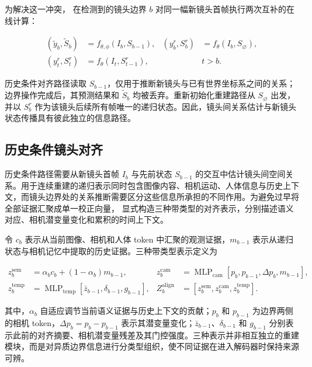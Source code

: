 为解决这一冲突，\method{} 在检测到的镜头边界 $b$ 对同一幅新镜头首帧执行两次互补的在线计算：

\begin{equation}
\begin{aligned}
 (\widetilde y_b,\widetilde S_b)&=f_{\theta,\phi}(I_b,S_{b-1}), &
 (y_b^r,S_b^r)&=f_\theta(I_b,S_{\varnothing}),\\
 (y_t^r,S_t^r)&=f_\theta(I_t,S_{t-1}^r), && t>b.
\end{aligned}
\label{eq:boundary-paths-zh}
\end{equation}

历史条件对齐路径读取 $S_{b-1}$，仅用于推断新镜头与已有世界坐标系之间的关系；边界操作完成后，其预测结果和 $\widetilde S_b$ 均被丢弃。重新初始化重建路径从 $S_{\varnothing}$ 出发，并以 $S_b^r$ 作为该镜头后续所有帧唯一的递归状态。因此，镜头间关系估计与新镜头状态传播具有彼此独立的信息路径。

\subsection{历史条件镜头对齐}

历史条件路径需要从新镜头首帧 $I_b$ 与先前状态 $S_{b-1}$ 的交互中估计镜头间空间关系。用于连续重建的递归表示同时包含图像内容、相机运动、人体信息与历史上下文，而镜头边界处的关系推断需要区分这些信息所承担的不同作用。为避免过早将全部证据汇聚成单一校正向量，\method{} 显式构造三种带类型的对齐表示，分别描述语义对应、相机潜变量变化和累积的时间上下文。

令 $c_b$ 表示从当前图像、相机和人体 token 中汇聚的观测证据，$m_{b-1}$ 表示从递归状态与相机记忆中提取的历史证据。三种带类型表示定义为

\begin{equation}
\begin{aligned}
 z_b^{\mathrm{sem}}&=\alpha_b c_b+(1-\alpha_b)m_{b-1}, &
 z_b^{\mathrm{cam}}&=\operatorname{MLP}_{\mathrm{cam}}
 [p_b,p_{b-1},\Delta p_b,m_{b-1}],\\
 z_b^{\mathrm{temp}}&=\operatorname{MLP}_{\mathrm{temp}}
 [\bar z_{b-1},\delta_{b-1},g_{b-1}], &
 Z_b^{\mathrm{align}}&=[z_b^{\mathrm{sem}},z_b^{\mathrm{cam}},z_b^{\mathrm{temp}}].
\end{aligned}
\label{eq:alignment-tokens-zh}
\end{equation}

其中，$\alpha_b$ 自适应调节当前语义证据与历史上下文的贡献；$p_b$ 和 $p_{b-1}$ 为边界两侧的相机 token，$\Delta p_b=p_b-p_{b-1}$ 表示其潜变量变化；$\bar z_{b-1}$、$\delta_{b-1}$ 和 $g_{b-1}$ 分别表示此前的对齐摘要、相机潜变量残差及其门控强度。三种表示并非相互独立的重建模块，而是对异质边界信息进行分类型组织，使不同证据在进入解码器时保持来源可辨。

